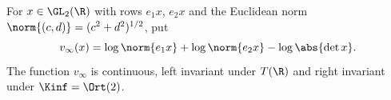For $x\in\GL_2(\R)$ with rows $e_1x$, $e_2x$ and the Euclidean norm $\norm{(c,d)}=(c^2+d^2)^{1/2}$, put
\[
  v_\infty(x)=\log\norm{e_1x}+\log\norm{e_2x}-\log\abs{\det x} .
\]
The function $v_\infty$ is continuous, left invariant under $T(\R)$ and right invariant under $\Kinf=\Ort(2)$.
